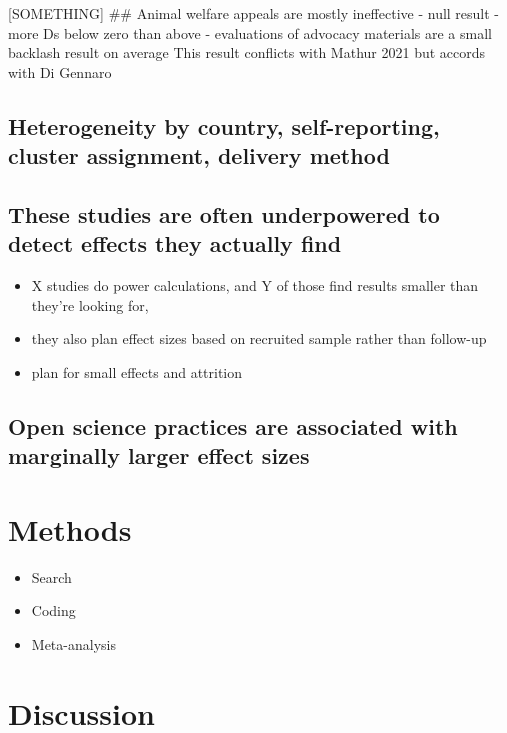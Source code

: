 \documentclass[sn-nature,pdflatex]{sn-jnl}
\providecommand{\tightlist}{%
  \setlength{\itemsep}{0pt}\setlength{\parskip}{0pt}}
\begin{document}
{[}SOMETHING{]} \#\# Animal welfare appeals are mostly ineffective -
null result - more Ds below zero than above - evaluations of advocacy
materials are a small backlash result on average This result conflicts
with Mathur 2021 but accords with Di Gennaro

\subsection{Heterogeneity by country, self-reporting, cluster
assignment, delivery
method}\label{heterogeneity-by-country-self-reporting-cluster-assignment-delivery-method}

\subsection{These studies are often underpowered to detect effects they
actually
find}\label{these-studies-are-often-underpowered-to-detect-effects-they-actually-find}

\begin{itemize}
\tightlist
\item
  X studies do power calculations, and Y of those find results smaller
  than they're looking for,
\item
  they also plan effect sizes based on recruited sample rather than
  follow-up
\item
  plan for small effects and attrition
\end{itemize}

\subsection{Open science practices are associated with marginally larger
effect
sizes}\label{open-science-practices-are-associated-with-marginally-larger-effect-sizes}

\section{Methods}\label{sec3}

\begin{itemize}
\tightlist
\item
  Search
\item
  Coding
\item
  Meta-analysis
\end{itemize}

\section{Discussion}\label{sec4}
\end{document}
